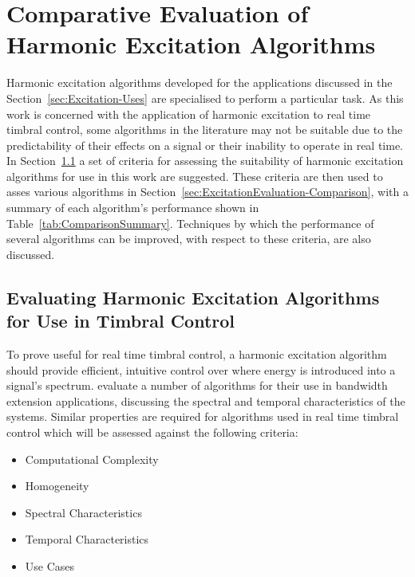 
\chapter{Comparative Evaluation of Harmonic Excitation Algorithms}
\label{chap:ExcitationEvaluation}
	Harmonic excitation algorithms developed for the applications discussed in the Section~\ref{sec:Excitation-Uses}
	are specialised to perform a particular task. As this work is concerned with the application of harmonic excitation
	to real time timbral control, some algorithms in the literature may not be suitable due to the predictability of
	their effects on a signal or their inability to operate in real time. In
	Section~\ref{sec:ExcitationEvaluation-Evaluation} a set of criteria for assessing the suitability of harmonic
	excitation algorithms for use in this work are suggested. These criteria are then used to asses various algorithms
	in Section~\ref{sec:ExcitationEvaluation-Comparison}, with a summary of each algorithm's performance shown in
	Table~\ref{tab:ComparisonSummary}. Techniques by which the performance of several algorithms can be improved, with
	respect to these criteria, are also discussed.

\section{Evaluating Harmonic Excitation Algorithms for Use in Timbral Control}
\label{sec:ExcitationEvaluation-Evaluation}
	To prove useful for real time timbral control, a harmonic excitation algorithm should provide efficient, intuitive
	control over where energy is introduced into a signal's spectrum. \citet{larsen2004audio} evaluate a number of
	algorithms for their use in bandwidth extension applications, discussing the spectral and temporal characteristics
	of the systems. Similar properties are required for algorithms used in real time timbral control which will be
	assessed against the following criteria:

	\begin{itemize}
		\item Computational Complexity
		\item Homogeneity
		\item Spectral Characteristics
		\item Temporal Characteristics
		\item Use Cases
	\end{itemize}

